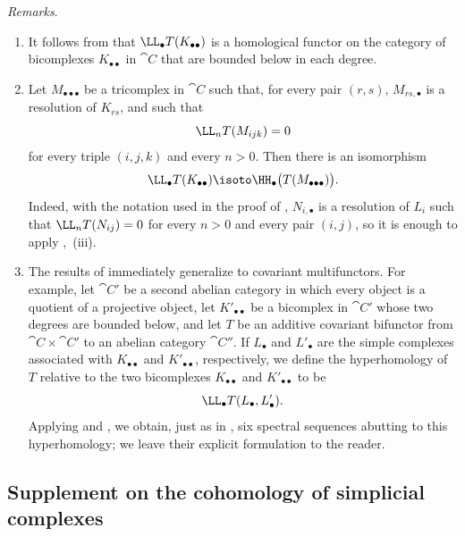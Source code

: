 \begin{env}[11.7.3]
\label{0.11.7.3}
\emph{Remarks}.
\begin{enumerate}
  \item[{\rm(i)}]
  It follows from  that
  $\LL_\bullet T(K_{\bullet\bullet})$ is a homological functor on the
  category of bicomplexes $K_{\bullet\bullet}$ in $\cat{C}$ that are
  bounded below in each degree.

  \item[{\rm(ii)}]
  Let $M_{\bullet\bullet\bullet}$ be a tricomplex in $\cat{C}$ such that,
  for every pair $(r,s)$, $M_{rs,\bullet}$ is a resolution of $K_{rs}$,
  and such that
  \[
    \LL_nT(M_{ijk})=0
  \]
  for every triple $(i,j,k)$ and every $n>0$.
  Then there is an isomorphism
  \[
    \LL_\bullet T(K_{\bullet\bullet})
    \isoto
    \HH_\bullet\bigl(T(M_{\bullet\bullet\bullet})\bigr).
  \]
  Indeed, with the notation used in the proof of ,
  $N_{i,\bullet}$ is a resolution of $L_i$ such that
  $\LL_nT(N_{ij})=0$ for every $n>0$ and every pair $(i,j)$, so it is
  enough to apply ,~(iii).

  \item[{\rm(iii)}]
  The results of  immediately generalize to covariant
  multifunctors.
  For example, let $\cat{C}'$ be a second abelian category in which every
  object is a quotient of a projective object, let
  $K'_{\bullet\bullet}$ be a bicomplex in $\cat{C}'$ whose two degrees are
  bounded below, and let $T$ be an additive covariant bifunctor from
  $\cat{C}\times\cat{C}'$ to an abelian category $\cat{C}''$.
  If $L_\bullet$ and $L'_\bullet$ are the simple complexes associated with
  $K_{\bullet\bullet}$ and $K'_{\bullet\bullet}$, respectively, we define
  the hyperhomology of $T$ relative to the two bicomplexes
  $K_{\bullet\bullet}$ and $K'_{\bullet\bullet}$ to be
  \[
    \LL_\bullet T(L_\bullet,L'_\bullet).
  \]
  Applying  and , we obtain, just as in
  , six spectral sequences abutting to this hyperhomology;
  we leave their explicit formulation to the reader.
\end{enumerate}
\end{env}

\subsection{Supplement on the cohomology of simplicial complexes}
\label{subsection:0.11.8}

